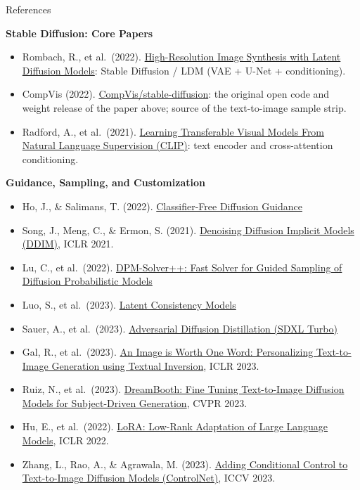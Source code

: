 \begin{frame}[allowframebreaks]{References}
\framebreak

\textbf{Stable Diffusion: Core Papers}
\begin{itemize}
    \item Rombach, R., et al.\ (2022). \href{https://arxiv.org/abs/2112.10752}{High-Resolution Image Synthesis with Latent Diffusion Models}: Stable Diffusion / LDM (VAE + U-Net + conditioning).
    \item CompVis (2022). \href{https://github.com/CompVis/stable-diffusion}{CompVis/stable-diffusion}: the original open code and weight release of the paper above; source of the text-to-image sample strip.
    \item Radford, A., et al.\ (2021). \href{https://arxiv.org/abs/2103.00020}{Learning Transferable Visual Models From Natural Language Supervision (CLIP)}: text encoder and cross-attention conditioning.
\end{itemize}

\framebreak

\textbf{Guidance, Sampling, and Customization}
\begin{itemize}
    \item Ho, J., \& Salimans, T. (2022). \href{https://arxiv.org/abs/2207.12598}{Classifier-Free Diffusion Guidance}
    \item Song, J., Meng, C., \& Ermon, S. (2021). \href{https://arxiv.org/abs/2010.02502}{Denoising Diffusion Implicit Models (DDIM)}, ICLR 2021.
    \item Lu, C., et al.\ (2022). \href{https://arxiv.org/abs/2211.01095}{DPM-Solver++: Fast Solver for Guided Sampling of Diffusion Probabilistic Models}
    \item Luo, S., et al.\ (2023). \href{https://arxiv.org/abs/2310.04378}{Latent Consistency Models}
    \item Sauer, A., et al.\ (2023). \href{https://arxiv.org/abs/2311.17042}{Adversarial Diffusion Distillation (SDXL Turbo)}
    \item Gal, R., et al.\ (2023). \href{https://arxiv.org/abs/2208.01618}{An Image is Worth One Word: Personalizing Text-to-Image Generation using Textual Inversion}, ICLR 2023.
    \item Ruiz, N., et al.\ (2023). \href{https://arxiv.org/abs/2208.12242}{DreamBooth: Fine Tuning Text-to-Image Diffusion Models for Subject-Driven Generation}, CVPR 2023.
    \item Hu, E., et al.\ (2022). \href{https://arxiv.org/abs/2106.09685}{LoRA: Low-Rank Adaptation of Large Language Models}, ICLR 2022.
    \item Zhang, L., Rao, A., \& Agrawala, M. (2023). \href{https://arxiv.org/abs/2302.05543}{Adding Conditional Control to Text-to-Image Diffusion Models (ControlNet)}, ICCV 2023.
\end{itemize}


\end{frame}
